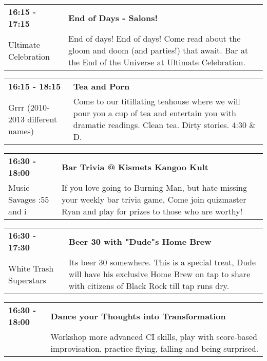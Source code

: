 \begin{tabular}{ p{1in} p{2.2in} }
    \textbf{16:15 - 17:15} & \textbf{End of Days - Salons!} \\
    Ultimate Celebration \newline  & End of days! End of days! Come read about the gloom and doom (and parties!) that await. Bar at the End of the Universe at Ultimate Celebration. \\
    \hline 
\end{tabular}
    
\begin{tabular}{ p{1in} p{2.2in} }
    \textbf{16:15 - 18:15} & \textbf{Tea and Porn} \\
    Grrr (2010-2013 different names) \newline  & Come to our titillating teahouse where we will pour you a cup of tea and entertain you with dramatic readings. Clean tea. Dirty stories. 4:30 \& D. \\
    \hline 
\end{tabular}
    
\begin{tabular}{ p{1in} p{2.2in} }
    \textbf{16:30 - 18:00} & \textbf{Bar Trivia @ Kismets Kangoo Kult} \\
    Music Savages \newline 8:55 and i & If you love going to Burning Man, but hate missing your weekly bar trivia game, Come join quizmaster Ryan and play for prizes to those who are worthy! \\
    \hline 
\end{tabular}
    
\begin{tabular}{ p{1in} p{2.2in} }
    \textbf{16:30 - 17:30} & \textbf{Beer 30 with "Dude"s Home Brew} \\
    White Trash Superstars \newline  & Its beer 30 somewhere. This is a special treat, Dude will have his exclusive Home Brew on tap to share with citizens of Black Rock till tap runs dry. \\
    \hline 
\end{tabular}
    
\begin{tabular}{ p{1in} p{2.2in} }
    \textbf{16:30 - 18:00} & \textbf{Dance your Thoughts into Transformation} \\
    ~ \newline  & Workshop more advanced CI skills, play with score-based improvisation, practice flying, falling and being surprised. \\
    \hline 
\end{tabular}
    
